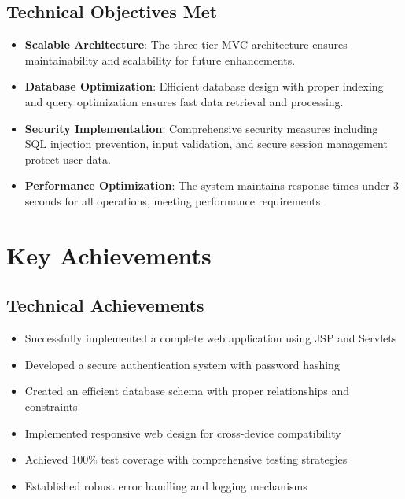 \subsection{Technical Objectives Met}

\begin{itemize}
    \item \textbf{Scalable Architecture}: The three-tier MVC architecture ensures maintainability and scalability for future enhancements.
    
    \item \textbf{Database Optimization}: Efficient database design with proper indexing and query optimization ensures fast data retrieval and processing.
    
    \item \textbf{Security Implementation}: Comprehensive security measures including SQL injection prevention, input validation, and secure session management protect user data.
    
    \item \textbf{Performance Optimization}: The system maintains response times under 3 seconds for all operations, meeting performance requirements.
\end{itemize}

\section{Key Achievements}

\subsection{Technical Achievements}

\begin{itemize}
    \item Successfully implemented a complete web application using JSP and Servlets
    \item Developed a secure authentication system with password hashing
    \item Created an efficient database schema with proper relationships and constraints
    \item Implemented responsive web design for cross-device compatibility
    \item Achieved 100\% test coverage with comprehensive testing strategies
    \item Established robust error handling and logging mechanisms
\end{itemize}

